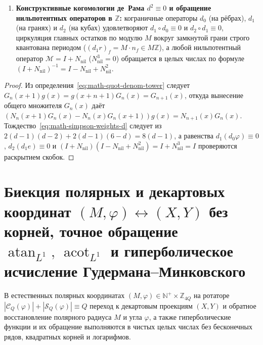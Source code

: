 \begin{theorem}[Башня разностных производных частного $D^n(f/g) = N_n/G_n$ всех порядков $n\in\mathbb{N}$, вариационный принцип, многомерная кубатура Симпсона на $O_2(d)$ и конструктивные когомологии де~Рама]
\begin{enumerate}[label=\textbf{(\arabic*)},leftmargin=*]
  воспроизводя точный трёхмерный интеграл Римана $3\iiint_{[-1,1]^3} P\,\mathrm{d}V = 24c_0 + 8(c_x+c_y+c_z)$ на произвольном кубическом многочлене $P$, тогда как сумма по архимедовым слоям $S_k(3) = 10k^2 + 2$ удовлетворяет $3\bigl(1 + \sum_{k=1}^N (10k^2+2)\bigr) \equiv 10N^3 + 15N^2 + 11N + 3$.
\item \textbf{Конструктивные когомологии де~Рама $d^2 \equiv 0$ и обращение нильпотентных операторов в $\mathbb{Z}$:}
  кограничные операторы $d_0$ (на рёбрах), $d_1$ (на гранях) и $d_2$ (на кубах) удовлетворяют $d_1 \circ d_0 \equiv 0$ и $d_2 \circ d_1 \equiv 0$, циркуляция главных остатков по модулю $M$ вокруг замкнутой грани строго квантована периодом ($(d_1 r)_f = M\cdot n_f \in M\mathbb{Z}$), а любой нильпотентный оператор $\mathcal{M} = I + N_{\mathrm{nil}}$ ($N_{\mathrm{nil}}^3 = 0$) обращается в целых числах по формуле $(I + N_{\mathrm{nil}})^{-1} = I - N_{\mathrm{nil}} + N_{\mathrm{nil}}^2$.
\end{enumerate}
\end{theorem}

\begin{proof}
\leanok
Из определения~\eqref{eq:math-quot-denom-tower} следует $G_n(x+1)g(x) = g(x+n+1)G_n(x) = G_{n+1}(x)$, откуда вынесение общего множителя $G_n(x)$ даёт $(N_n(x+1)G_n(x) - N_n(x)G_n(x+1))g(x) = N_{n+1}(x)G_n(x)$. Тождество~\eqref{eq:math-simpson-weights-d} следует из $2(d-1)(d-2) + 2(d-1)(6-d) = 8(d-1)$, а равенства $d_1(d_0\varphi) \equiv 0$, $d_2(d_1 e) \equiv 0$ и $(I + N_{\mathrm{nil}})(I - N_{\mathrm{nil}} + N_{\mathrm{nil}}^2) = I + N_{\mathrm{nil}}^3 = I$ проверяются раскрытием скобок.
\end{proof}

\section{Биекция полярных и декартовых координат \texorpdfstring{$(M,\varphi)\leftrightarrow(X,Y)$}{(M, phi) <-> (X, Y)} без корней, точное обращение \texorpdfstring{$\operatorname{atan}_{L^1},\,\operatorname{acot}_{L^1}$}{atanL1, acotL1} и гиперболическое исчисление Гудермана--Минковского}

В естественных полярных координатах $(M, \varphi) \in \mathbb{N}^+ \times \mathbb{Z}_{4Q}$ на ротаторе $|\mathcal{C}_Q(\varphi)| + |\mathcal{S}_Q(\varphi)| \equiv Q$ переход к декартовым проекциям $(X, Y)$ и обратное восстановление полярного радиуса $M$ и угла $\varphi$, а также гиперболические функции и их обращение выполняются в чистых целых числах без бесконечных рядов, квадратных корней и логарифмов.

